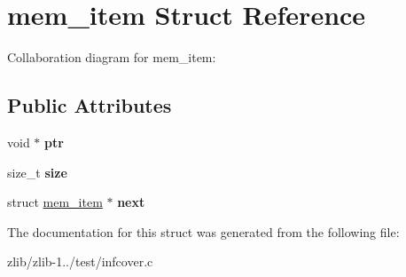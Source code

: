 \hypertarget{structmem__item}{\section{mem\+\_\+item Struct Reference}
\label{structmem__item}
}


Collaboration diagram for mem\+\_\+item\+:
\subsection*{Public Attributes}
\begin{DoxyCompactItemize}
\item 
\hypertarget{structmem__item_a3efece3e9c8962488a0bf0a4df344262}{void $\ast$ {\bfseries ptr}}\label{structmem__item_a3efece3e9c8962488a0bf0a4df344262}

\item 
\hypertarget{structmem__item_acc5bc924e058e6ab12afa4d502522e56}{size\+\_\+t {\bfseries size}}\label{structmem__item_acc5bc924e058e6ab12afa4d502522e56}

\item 
\hypertarget{structmem__item_a046ad7c7253a56bd3782c7a79d724979}{struct \hyperlink{structmem__item}{mem\+\_\+item} $\ast$ {\bfseries next}}\label{structmem__item_a046ad7c7253a56bd3782c7a79d724979}

\end{DoxyCompactItemize}


The documentation for this struct was generated from the following file\+:\begin{DoxyCompactItemize}
\item 
zlib/zlib-\/1../test/infcover.\+c\end{DoxyCompactItemize}
